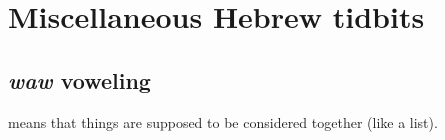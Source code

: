 \section{Miscellaneous Hebrew tidbits}\label{app:misc-heb}
\subsection{\textit{waw} voweling}\label{app:waw-voweling}
 means that things are supposed to be considered together (like a list).
